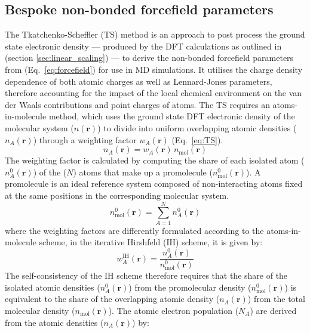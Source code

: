 \subsection{Bespoke non-bonded forcefield parameters}\label{sec:ddec}
%
The Tkatchenko-Scheffler (TS) method is an approach to post process the ground state electronic density --- produced by the DFT calculations as outlined in (section \ref{sec:linear_scaling}) --- to derive the non-bonded forcefield parameters from (Eq.~\ref{eq:forcefield}) for use in MD simulations.\cite{tkatchenko2009accurate} It utilises the charge density dependence of both atomic charges as well as Lennard-Jones parameters, therefore accounting for the impact of the local chemical environment on the van der Waals contributions and point charges of atoms. The TS  requires an atoms-in-molecule method, which uses the ground state DFT electronic density of the molecular system ($n(\mathbf{r})$) to divide into uniform overlapping atomic densities ($n_{A}(\mathbf{r})$) through a weighting factor $w_{A}(\mathbf{r})$ (Eq.~\ref{eq:TS}).\cite{tkatchenko2009accurate,manz2012improved}
%
\begin{equation} \label{eq:TS}
n_{A}(\mathbf{r})=w_{A}(\mathbf{r})\,n_{\mathrm{mol}}(\mathbf{r})
\end{equation}
%
The weighting factor is calculated by computing the share of each isolated atom ($n_{A}^0(\mathbf{r})$) of the ($N$) atoms that make up a promolecule ($n_{\mathrm{mol}}^0(\mathbf{r})$). A promolecule is an ideal reference system composed of non-interacting atoms fixed at the same positions in the corresponding molecular system.
\begin{equation}
    n_{\mathrm{mol}}^0(\mathbf{r}) = \sum_{A=1}^N n_{A}^0(\mathbf{r})
\end{equation}
where the weighting factors are differently formulated according to the atoms-in-molecule scheme, in the iterative Hirshfeld (IH) scheme,\cite{bultinck2007uniqueness} it is given by:
\begin{equation}
    w_{A}^{\mathrm{IH}}(\mathbf{r}) = \frac{n_{A}^0(\mathbf{r})}{n_{\mathrm{mol}}^0(\mathbf{r})}
\end{equation}
The self-consistency of the IH scheme therefore requires that the share of the isolated atomic densities ($n_{A}^0(\mathbf{r})$) from the promolecular density ($n_{\mathrm{mol}}^0(\mathbf{r})$) is equivalent to the share of the overlapping atomic density ($n_{A}(\mathbf{r})$) from the total molecular density ($n_{\mathrm{mol}}(\mathbf{r})$). The atomic electron population ($N_A$) are derived from the atomic densities ($n_{A}(\mathbf{r})$) by:
